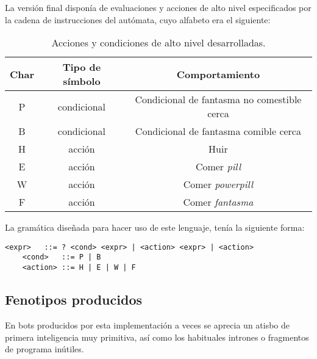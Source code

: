 \blankline

La versión final disponía de evaluaciones y acciones de alto nivel especificados por la cadena de instrucciones del autómata, cuyo alfabeto era el siguiente:
\begin{table}[H]
\centering
\begin{tabular}{ccc}
\hline
\textbf{Char} & \textbf{Tipo de símbolo} & \textbf{Comportamiento}                     \\ \hline
P             & condicional              & Condicional de fantasma no comestible cerca \\
B             & condicional              & Condicional de fantasma comible cerca       \\
H             & acción                   & Huir                                        \\
E             & acción                   & Comer \textit{pill}                         \\
W             & acción                   & Comer \textit{powerpill}                    \\
F             & acción                   & Comer \textit{fantasma}                     \\ \hline
\end{tabular}
\caption{Acciones y condiciones de alto nivel desarrolladas.}
\end{table}

La gramática diseñada para hacer uso de este lenguaje, tenía la siguiente forma:
\begin{lstlisting}[frame=single, breaklines=no, basicstyle=\fontsize{10}{11}\ttfamily, caption=Gramática con acciones de alto nivel., captionpos=b]
    <expr>   ::= ? <cond> <expr> | <action> <expr> | <action>
    <cond>   ::= P | B
    <action> ::= H | E | W | F
\end{lstlisting}

\subsection{Fenotipos producidos}
En bots producidos por esta implementación a veces se aprecia un atisbo de primera inteligencia muy primitiva, así como los habituales intrones o fragmentos de programa inútiles.
 
